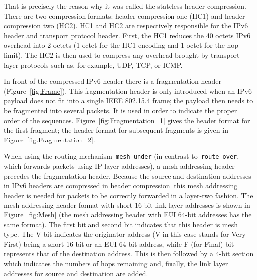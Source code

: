 That is precisely the reason why it was called the stateless header compression. There are two compression formats: header compression one (HC1) and header compression two (HC2). HC1 and HC2 are respectively responsible for the IPv6 header and transport protocol header.  First, the HC1 reduces the 40 octets IPv6 overhead into 2 octets (1 octet for the HC1 encoding and 1 octet for the hop limit). The HC2 is then used to compress any overhead brought by transport layer protocols such as, for example, UDP, TCP, or ICMP.
\newline



In front of the compressed IPv6 header there is a fragmentation header (Figure~\ref{fig:Frame}). This fragmentation header is only introduced when an IPv6 payload does not fit into a single IEEE 802.15.4 frame;
the payload then needs to be fragmented into several packets. It is used in order to indicate the proper order of the sequences. Figure~\ref{fig:Fragmentation_1} gives the header format for the first
fragment; the header format for subsequent fragments is given in Figure~\ref{fig:Fragmentation_2}.
\newline

When using the routing mechanism~\texttt{mesh-under} (in contrast to~\texttt{route-over}, which forwards packets using IP layer addresses), a mesh addressing header precedes the fragmentation header. Because the source and destination addresses in IPv6 headers are compressed in header compression, this mesh addressing header is needed for packets to be correctly forwarded in a layer-two fashion. The mesh addressing header format with short 16-bit link layer addresses is shown in Figure~\ref{fig:Mesh} (the mesh addressing header with EUI 64-bit addresses has the same format). The first bit and second bit indicates that this header is mesh type. The V bit indicates the originator address (V in this case stands for Very First) being a short 16-bit or an EUI 64-bit address, while F (for Final) bit represents that of the destination address.  This is then followed by a 4-bit section which indicates the numbers of hops remaining and, finally, the link layer addresses for source and destination are added.
\newline

